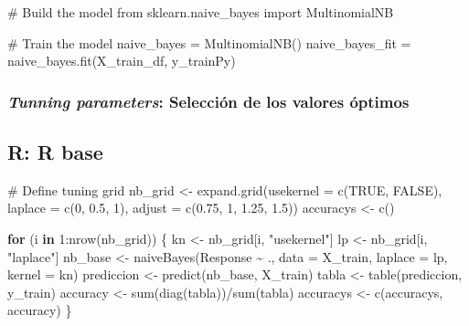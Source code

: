 \documentclass[
  letterpaper,
  DIV=11,
  numbers=noendperiod]{scrartcl}
\newenvironment{Shaded}{\begin{snugshade}}{\end{snugshade}}
\newcommand{\AttributeTok}[1]{\textcolor[rgb]{0.40,0.45,0.13}{#1}}
\newcommand{\CommentTok}[1]{\textcolor[rgb]{0.37,0.37,0.37}{#1}}
\newcommand{\ConstantTok}[1]{\textcolor[rgb]{0.56,0.35,0.01}{#1}}
\newcommand{\ControlFlowTok}[1]{\textcolor[rgb]{0.00,0.23,0.31}{\textbf{#1}}}
\newcommand{\DecValTok}[1]{\textcolor[rgb]{0.68,0.00,0.00}{#1}}
\newcommand{\FloatTok}[1]{\textcolor[rgb]{0.68,0.00,0.00}{#1}}
\newcommand{\FunctionTok}[1]{\textcolor[rgb]{0.28,0.35,0.67}{#1}}
\newcommand{\ImportTok}[1]{\textcolor[rgb]{0.00,0.46,0.62}{#1}}
\newcommand{\NormalTok}[1]{\textcolor[rgb]{0.00,0.23,0.31}{#1}}
\newcommand{\OperatorTok}[1]{\textcolor[rgb]{0.37,0.37,0.37}{#1}}
\newcommand{\OtherTok}[1]{\textcolor[rgb]{0.00,0.23,0.31}{#1}}
\newcommand{\SpecialCharTok}[1]{\textcolor[rgb]{0.37,0.37,0.37}{#1}}
\newcommand{\StringTok}[1]{\textcolor[rgb]{0.13,0.47,0.30}{#1}}
\begin{document}
\begin{Shaded}
\begin{Highlighting}[]
\CommentTok{\# Build the model}
\ImportTok{from}\NormalTok{ sklearn.naive\_bayes }\ImportTok{import}\NormalTok{ MultinomialNB}

\CommentTok{\# Train the model}
\NormalTok{naive\_bayes }\OperatorTok{=}\NormalTok{ MultinomialNB()}
\NormalTok{naive\_bayes\_fit }\OperatorTok{=}\NormalTok{ naive\_bayes.fit(X\_train\_df, y\_trainPy)}
\end{Highlighting}
\end{Shaded}

\subsubsection{\texorpdfstring{\emph{Tunning parameters}: Selección de
los valores
óptimos}{Tunning parameters: Selección de los valores óptimos}}\label{tunning-parameters-selecciuxf3n-de-los-valores-uxf3ptimos}

\subsection{R: R base}

\begin{Shaded}
\begin{Highlighting}[]
\CommentTok{\# Define tuning grid }
\NormalTok{nb\_grid }\OtherTok{\textless{}{-}} \FunctionTok{expand.grid}\NormalTok{(}\AttributeTok{usekernel =} \FunctionTok{c}\NormalTok{(}\ConstantTok{TRUE}\NormalTok{, }\ConstantTok{FALSE}\NormalTok{),}
                       \AttributeTok{laplace =} \FunctionTok{c}\NormalTok{(}\DecValTok{0}\NormalTok{, }\FloatTok{0.5}\NormalTok{, }\DecValTok{1}\NormalTok{), }
                       \AttributeTok{adjust =} \FunctionTok{c}\NormalTok{(}\FloatTok{0.75}\NormalTok{, }\DecValTok{1}\NormalTok{, }\FloatTok{1.25}\NormalTok{, }\FloatTok{1.5}\NormalTok{))}
\NormalTok{accuracys }\OtherTok{\textless{}{-}} \FunctionTok{c}\NormalTok{()}

\ControlFlowTok{for}\NormalTok{ (i }\ControlFlowTok{in} \DecValTok{1}\SpecialCharTok{:}\FunctionTok{nrow}\NormalTok{(nb\_grid)) \{}
\NormalTok{  kn }\OtherTok{\textless{}{-}}\NormalTok{ nb\_grid[i, }\StringTok{"usekernel"}\NormalTok{]}
\NormalTok{  lp }\OtherTok{\textless{}{-}}\NormalTok{ nb\_grid[i, }\StringTok{"laplace"}\NormalTok{]}
\NormalTok{  nb\_base }\OtherTok{\textless{}{-}} \FunctionTok{naiveBayes}\NormalTok{(Response }\SpecialCharTok{\textasciitilde{}}\NormalTok{ ., }\AttributeTok{data =}\NormalTok{ X\_train, }\AttributeTok{laplace =}\NormalTok{ lp, }\AttributeTok{kernel =}\NormalTok{ kn)}
\NormalTok{  prediccion }\OtherTok{\textless{}{-}} \FunctionTok{predict}\NormalTok{(nb\_base, X\_train)}
\NormalTok{  tabla }\OtherTok{\textless{}{-}} \FunctionTok{table}\NormalTok{(prediccion, y\_train)}
\NormalTok{  accuracy }\OtherTok{\textless{}{-}} \FunctionTok{sum}\NormalTok{(}\FunctionTok{diag}\NormalTok{(tabla))}\SpecialCharTok{/}\FunctionTok{sum}\NormalTok{(tabla)}
\NormalTok{  accuracys }\OtherTok{\textless{}{-}} \FunctionTok{c}\NormalTok{(accuracys, accuracy)}
\NormalTok{\}}
\end{Highlighting}
\end{Shaded}
\end{document}
